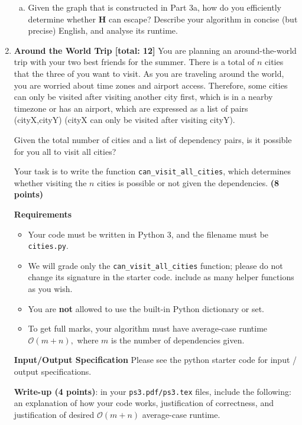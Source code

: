 \documentclass{assignment-263}
\begin{document}
\begin{enumerate}[1.]
\begin{enumerate}[(a)]
\item Given the graph that is constructed in Part 3a, how do you
  efficiently determine whether \textbf{H} can escape? 
Describe your algorithm in concise (but precise) English, and analyse its runtime.
\end{enumerate}

\program

\item \textbf{Around the World Trip [total: 12]}
You are planning an around-the-world trip with your two best friends for the summer. 
There is a total of $n$ cities that the three of you want to visit.
As you are traveling around the world, you are worried about time zones and airport access. Therefore, some cities can only be visited after visiting another city first, which is in a nearby timezone or has an airport, which are expressed as a list of pairs (cityX,cityY) (cityX can only be visited after visiting cityY).

Given the total number of cities and a list of dependency pairs, is it possible for you all to visit all cities?

Your task is to write the function \verb|can_visit_all_cities|, which determines whether visiting the $n$ cities is possible or not given the dependencies. \textbf{(8 points)}

\textbf{Requirements}
\begin{itemize}
\item Your code must be written in Python 3, and the filename must be \verb|cities.py|.
\item We will grade only the \verb|can_visit_all_cities| function; please do not change its signature in the starter code. include as many helper functions as you wish.
\item You are {\bf not} allowed to use the built-in Python dictionary or set.
\item To get full marks, your algorithm must have average-case runtime
  $\mathcal{O}(m + n),$ where $m$ is the number of dependencies given.
\end{itemize}

\textbf{Input/Output Specification}
Please see the python starter code for input / output
specifications. 

\textbf{Write-up (4 points)}: in your \verb|ps3.pdf/ps3.tex| files,
include the following: an explanation of how your code works,
justification of correctness, and justification of desired
$\mathcal{O}(m + n)$ average-case runtime.

 \end{enumerate}
\end{document}
